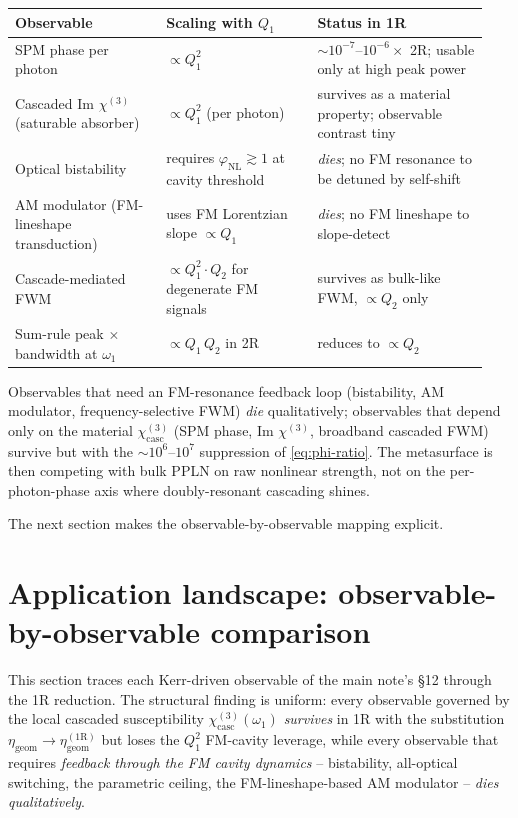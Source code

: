 \documentclass[11pt,a4paper]{article}
\newcommand{\chithree}{\chi^{(3)}}
\newcommand{\chicasc}{\chi^{(3)}_{\text{casc}}}
\begin{document}
\begin{center}\small
\begin{tabular}{p{0.30\linewidth}p{0.30\linewidth}p{0.34\linewidth}}
  \toprule
  Observable
   & Scaling with $Q_1$
   & Status in 1R \\
  \midrule
  SPM phase per photon
   & $\propto Q_1^{2}$
   & $\sim 10^{-7}$--$10^{-6}\times$ 2R; usable only at high peak power \\[2pt]
  Cascaded Im $\chithree$ (saturable absorber)
   & $\propto Q_1^{2}$ (per photon)
   & survives as a material property; observable contrast tiny \\[2pt]
  Optical bistability
   & requires $\varphi_\text{NL}\!\gtrsim\!1$ at cavity threshold
   & \emph{dies}; no FM resonance to be detuned by self-shift \\[2pt]
  AM modulator (FM-lineshape transduction)
   & uses FM Lorentzian slope $\propto Q_1$
   & \emph{dies}; no FM lineshape to slope-detect \\[2pt]
  Cascade-mediated FWM
   & $\propto Q_1^{2}\cdot Q_2$ for degenerate FM signals
   & survives as bulk-like FWM, $\propto Q_2$ only \\[2pt]
  Sum-rule peak $\times$ bandwidth at $\omega_1$
   & $\propto Q_1\,Q_2$ in 2R
   & reduces to $\propto Q_2$ \\
  \bottomrule
\end{tabular}
\end{center}

Observables that need an FM-resonance feedback loop (bistability, AM
modulator, frequency-selective FWM) \emph{die} qualitatively; observables
that depend only on the material $\chithree_\text{casc}$ (SPM phase,
Im $\chithree$, broadband cascaded FWM) survive but with the $\sim 10^{6}$--$10^{7}$
suppression of \eqref{eq:phi-ratio}.  The metasurface is then competing
with bulk PPLN on raw nonlinear strength, not on the per-photon-phase axis
where doubly-resonant cascading shines.

The next section makes the observable-by-observable mapping explicit.

\section{Application landscape: observable-by-observable comparison}\label{sec:applications-1R}

This section traces each Kerr-driven observable of the main note's \S 12
through the 1R reduction.  The structural finding is uniform: every
observable governed by the local cascaded susceptibility
$\chicasc(\omega_1)$ \emph{survives} in 1R with the substitution
$\eta_\text{geom}\to\eta_\text{geom}^{(1\mathrm R)}$ but loses the
$Q_1^{2}$ FM-cavity leverage, while every observable that requires
\emph{feedback through the FM cavity dynamics} -- bistability, all-optical
switching, the parametric ceiling, the FM-lineshape-based AM
modulator -- \emph{dies qualitatively}.
\end{document}

